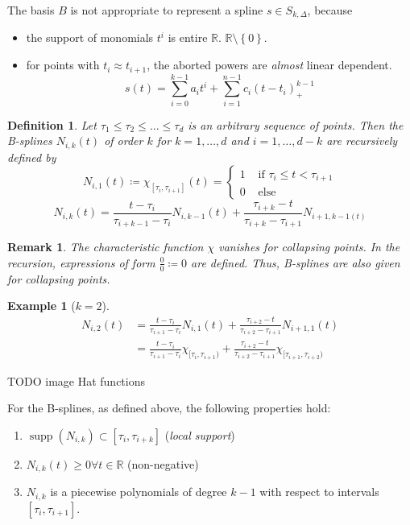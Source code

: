 \documentclass[a4paper]{article}
\newcounter{lecref}[section]
\numberwithin{lecref}{section}
\theoremstyle{break}
\newtheorem{example}[lecref]{Example}
\newtheorem{definition}[lecref]{Definition}
\newtheorem*{Remark}{Remark}
\newcommand{\Set}[1]{\left\{#1\right\}}
\begin{document}
The basis $B$ is not appropriate to represent a spline $s \in S_{k,\Delta}$, because
\begin{itemize}
  \item the support of monomials $t^i$ is entire $\mathbb R$. $\mathbb R \setminus \Set{0}$.
  \item for points with $t_i \approx t_{i+1}$, the aborted powers are \emph{almost} linear dependent.
    \[ s(t) = \sum_{i=0}^{k-1} a_i t^i + \sum_{i=1}^{n-1} c_i (t - t_i)_+^{k-1} \]
\end{itemize}

\begin{definition}
  \label{definition:4-21}
  Let $\tau_1 \leq \tau_2 \leq \dots \leq \tau_d$ is an arbitrary sequence of points.
  Then the B-splines $N_{i,k}(t)$ of order $k$ for $k = 1, \dots, d$ and $i = 1, \dots, d-k$
  are recursively defined by
  \[
    N_{i,1}(t) \coloneqq \chi_{[\tau_i,\tau_{i+1}]}(t) = \begin{cases}
      1 & \text{ if } \tau_i \leq t < \tau_{i+1} \\
      0 & \text{ else}
    \end{cases}
  \] \[
    N_{i,k}(t) = \frac{t - \tau_i}{\tau_{i+k-1} - \tau_i} N_{i,k-1}(t) + \frac{\tau_{i+k} - t}{\tau_{i+k} - \tau_{i+1}} N_{i+1,k-1(t)}
  \]
\end{definition}

\begin{Remark}
  The characteristic function $\chi$ vanishes for collapsing points.
  In the recursion, expressions of form $\frac00 \coloneqq 0$ are defined.
  Thus, B-splines are also given for collapsing points.
\end{Remark}

\begin{example}[$k=2$]
  \begin{align*}
    N_{i,2}(t) &= \frac{t - \tau_i}{\tau_{i+1} - \tau_i} N_{i,1}(t) + \frac{\tau_{i+2} - t}{\tau_{i+2} - \tau_{i+1}} N_{i+1,1}(t) \\
      &= \frac{t - \tau_i}{\tau_{i+1} - \tau_i} \chi_{[\tau_i,\tau_{i+1})} + \frac{\tau_{i+2} - t}{\tau_{i+2} - \tau_{i+1}} \chi_{[\tau_{i+1},\tau_{i+2})}
  \end{align*}
\end{example}

TODO image Hat functions

For the B-splines, as defined above, the following properties hold:
\begin{enumerate}
  \item $\operatorname{supp}(N_{i,k}) \subset [\tau_i, \tau_{i+k}]$ (\emph{local support})
  \item $N_{i,k}(t) \geq 0 \forall t \in \mathbb R$ (non-negative)
  \item $N_{i,k}$ is a piecewise polynomials of degree $k-1$ with respect to intervals $[\tau_i, \tau_{i+1}]$.
\end{enumerate}
\end{document}
